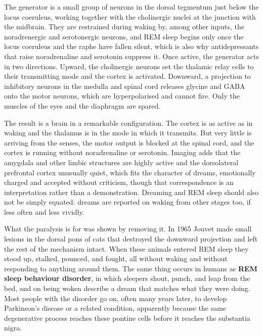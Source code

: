 \documentclass[11pt]{article}
\begin{document}
The generator is a small group of neurons in the dorsal tegmentum just below the locus coeruleus, working together with the cholinergic nuclei at the junction with the midbrain. They are restrained during waking by, among other inputs, the noradrenergic and serotonergic neurons, and REM sleep begins only once the locus coeruleus and the raphe have fallen silent, which is also why antidepressants that raise noradrenaline and serotonin suppress it. Once active, the generator acts in two directions. Upward, the cholinergic neurons set the thalamic relay cells to their transmitting mode and the cortex is activated. Downward, a projection to inhibitory neurons in the medulla and spinal cord releases glycine and GABA onto the motor neurons, which are hyperpolarised and cannot fire. Only the muscles of the eyes and the diaphragm are spared.

The result is a brain in a remarkable configuration. The cortex is as active as in waking and the thalamus is in the mode in which it transmits. But very little is arriving from the senses, the motor output is blocked at the spinal cord, and the cortex is running without noradrenaline or serotonin. Imaging adds that the amygdala and other limbic structures are highly active and the dorsolateral prefrontal cortex unusually quiet, which fits the character of dreams, emotionally charged and accepted without criticism, though that correspondence is an interpretation rather than a demonstration. Dreaming and REM sleep should also not be simply equated: dreams are reported on waking from other stages too, if less often and less vividly.

What the paralysis is for was shown by removing it. In 1965 Jouvet made small lesions in the dorsal pons of cats that destroyed the downward projection and left the rest of the mechanism intact. When these animals entered REM sleep they stood up, stalked, pounced, and fought, all without waking and without responding to anything around them. The same thing occurs in humans as \textbf{REM sleep behaviour disorder}, in which sleepers shout, punch, and leap from the bed, and on being woken describe a dream that matches what they were doing. Most people with the disorder go on, often many years later, to develop Parkinson's disease or a related condition, apparently because the same degenerative process reaches these pontine cells before it reaches the substantia nigra.
\end{document}
